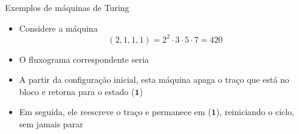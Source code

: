 \begin{frame}[fragile]{Exemplos de máquinas de Turing}

    \begin{itemize}
        \item Considere a máquina 
        \[
            (2, 1, 1, 1) = 2^2\cdot 3\cdot 5\cdot 7 = 420
        \]

        \item O fluxograma correspondente seria

    \begin{figure}[h]
        \centering
    \end{figure}

        \item A partir da configuração inicial, esta máquina apaga o traço que está no bloco e
            retorna para o estado ($\mathbf{1}$)

        \item Em seguida, ele reescreve o traço e permanece em ($\mathbf{1}$), reiniciando o ciclo,
            sem jamais parar
    \end{itemize}

\end{frame}

